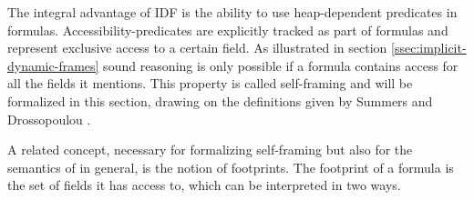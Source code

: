 The integral advantage of IDF is the ability to use heap-dependent predicates in formulas.
Accessibility-predicates are explicitly tracked as part of formulas and represent exclusive access to a certain field.
As illustrated in section \ref{ssec:implicit-dynamic-frames} sound reasoning is only possible if a formula contains access for all the fields it mentions.
This property is called self-framing and will be formalized in this section, drawing on the definitions given by Summers and Drossopoulou \cite{summers2013formal}.

A related concept, necessary for formalizing self-framing but also for the semantics of \svlidf in general, is the notion of footprints.
The footprint of a formula is the set of fields it has access to, which can be interpreted in two ways.

